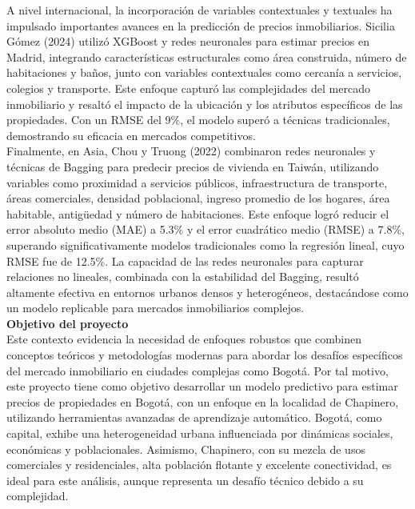 \documentclass[a4paper]{article}
\theoremstyle{remark}
\theoremstyle{definition}
\begin{document}
A nivel internacional, la incorporación de variables contextuales y textuales ha impulsado importantes avances en la predicción de precios inmobiliarios. Sicilia Gómez (2024) utilizó XGBoost y redes neuronales para estimar precios en Madrid, integrando características estructurales como área construida, número de habitaciones y baños, junto con variables contextuales como cercanía a servicios, colegios y transporte. Este enfoque capturó las complejidades del mercado inmobiliario y resaltó el impacto de la ubicación y los atributos específicos de las propiedades. Con un RMSE del 9\%, el modelo superó a técnicas tradicionales, demostrando su eficacia en mercados competitivos. \\

Finalmente, en Asia, Chou y Truong (2022) combinaron redes neuronales y técnicas de Bagging para predecir precios de vivienda en Taiwán, utilizando variables como proximidad a servicios públicos, infraestructura de transporte, áreas comerciales, densidad poblacional, ingreso promedio de los hogares, área habitable, antigüedad y número de habitaciones. Este enfoque logró reducir el error absoluto medio (MAE) a 5.3\% y el error cuadrático medio (RMSE) a 7.8\%, superando significativamente modelos tradicionales como la regresión lineal, cuyo RMSE fue de 12.5\%. La capacidad de las redes neuronales para capturar relaciones no lineales, combinada con la estabilidad del Bagging, resultó altamente efectiva en entornos urbanos densos y heterogéneos, destacándose como un modelo replicable para mercados inmobiliarios complejos. \\

\textbf{Objetivo del proyecto} \\

Este contexto evidencia la necesidad de enfoques robustos que combinen conceptos teóricos y metodologías modernas para abordar los desafíos específicos del mercado inmobiliario en ciudades complejas como Bogotá. Por tal  motivo, este proyecto tiene como objetivo desarrollar un modelo predictivo para estimar precios de propiedades en Bogotá, con un enfoque en la localidad de Chapinero, utilizando herramientas avanzadas de aprendizaje automático. Bogotá, como capital, exhibe una heterogeneidad urbana influenciada por dinámicas sociales, económicas y poblacionales. Asimismo, Chapinero, con su mezcla de usos comerciales y residenciales, alta población flotante y excelente conectividad, es ideal para este análisis, aunque representa un desafío técnico debido a su complejidad. \\
\end{document}
